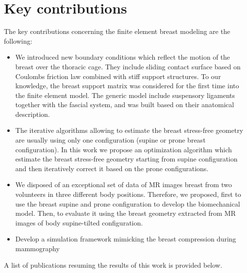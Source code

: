 \chapter*{Key contributions}\label{section:keycontributions}

The key contributions concerning the finite element breast modeling are the following:

\begin{itemize}
\item We introduced new boundary conditions which reflect the motion of the breast over the thoracic cage.  They include sliding contact surface based on Coulombs friction law combined with stiff support structures. To our knowledge,  the breast support matrix was considered for the first time into the finite element model. The generic model include suspensory ligaments together with the fascial system, and was built based on their anatomical description.   

\item The iterative algorithms allowing to estimate the breast stress-free  geometry are usually using only one configuration (supine or prone breast configuration). In this work we propose an optimization algorithm which estimate the breast stress-free geometry starting from supine configuration and then iteratively correct it based on the prone configurations. 

\item  We disposed of an exceptional set of data of MR images breast from two volunteers in three different body positions. Therefore,  we proposed, first to use the breast supine and prone configuration to  develop the biomechanical  model. Then, to evaluate it using the  breast geometry extracted from MR images of body supine-tilted configuration.

\item Develop a simulation framework mimicking the breast compression during mammography 
\end{itemize}

A list of publications resuming the results of this work is provided below.
\cleardoublepage
 
